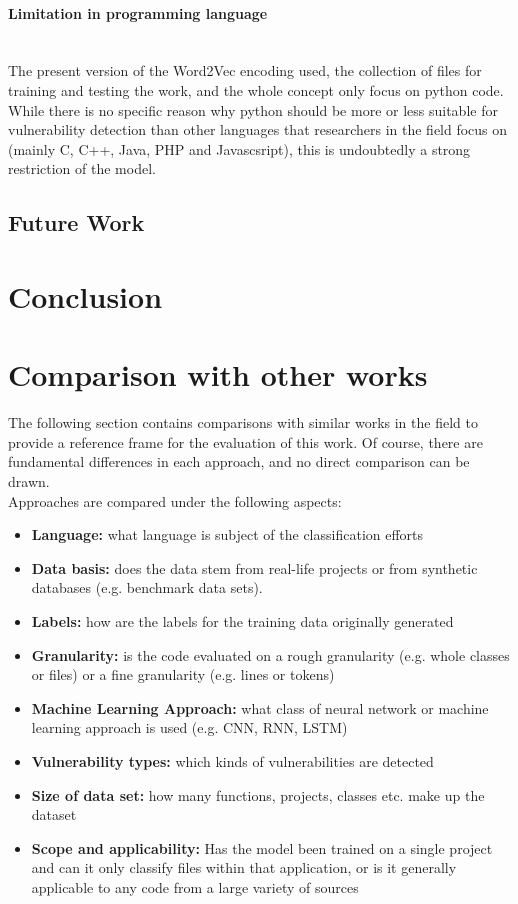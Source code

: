 \documentclass[
	a4paper,
	pagesize,
	pdftex,
	12pt,
	twoside, %
	BCOR=5mm, %
	ngerman,
	fleqn,
	final,
	]{scrartcl}
\begin{document}
\paragraph{Limitation in programming language}\mbox{}\\
The present version of the Word2Vec encoding used, the collection of files for training and testing the work, and the whole concept only focus on python code. While there is no specific reason why python should be more or less suitable for vulnerability detection than other languages that researchers in the field focus on (mainly C, C++, Java, PHP and Javascsript), this is undoubtedly a strong restriction of the model.


\subsection{Future Work}




\section{Conclusion}





\section{Comparison with other works}

The following section contains comparisons with similar works in the field to provide a reference frame for the evaluation of this work. Of course, there are fundamental differences in each approach, and no direct comparison can be drawn.\\
Approaches are compared under the following aspects:\\
\begin{itemize}
	\item \textbf{Language:} what language is subject of the classification efforts
	\item \textbf{Data basis:} does the data stem from real-life projects or from synthetic databases (e.g. benchmark data sets).
	\item \textbf{Labels:} how are the labels for the training data originally generated
	\item \textbf{Granularity:} is the code evaluated on a rough granularity (e.g. whole classes or files) or a fine granularity (e.g. lines or tokens)
	\item \textbf{Machine Learning Approach:} what class of neural network or machine learning approach is used (e.g. CNN, RNN, LSTM)
	\item \textbf{Vulnerability types:} which kinds of vulnerabilities are detected
	\item \textbf{Size of data set:} how many functions, projects, classes etc. make up the dataset
	\item \textbf{Scope and applicability:} Has the model been trained on a single project and can it only classify files within that application, or is it generally applicable to any code from a large variety of sources
\end{itemize}
\end{document}

